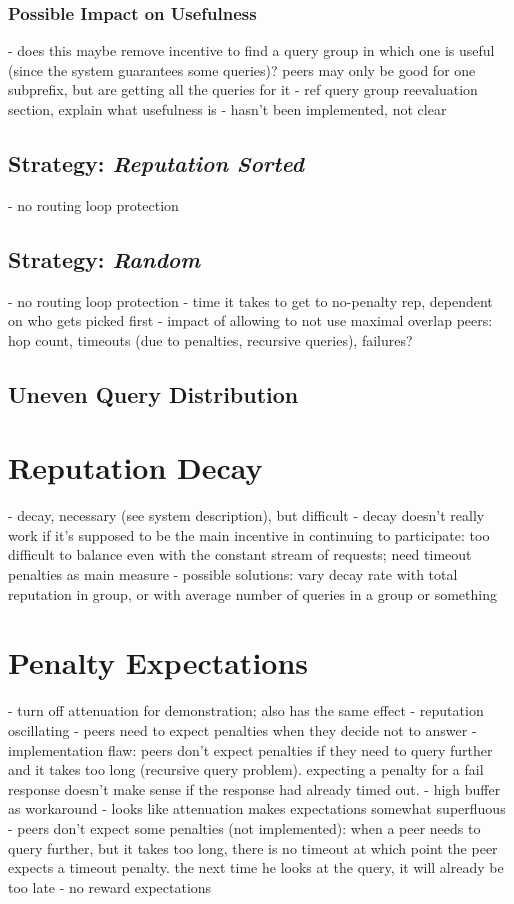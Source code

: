\subsubsection{Possible Impact on Usefulness}
- does this maybe remove incentive to find a query group in which one is useful
  (since the system guarantees some queries)? peers may only be good for one
  subprefix, but are getting all the queries for it
- ref query group reevaluation section, explain what usefulness is
- hasn't been implemented, not clear

\subsection{Strategy: \emph{Reputation Sorted}}
- no routing loop protection
\subsection{Strategy: \emph{Random}}
- no routing loop protection
- time it takes to get to no-penalty rep, dependent on who gets picked first
- impact of allowing to not use maximal overlap peers: hop count, timeouts (due
  to penalties, recursive queries), failures?
\subsection{Uneven Query Distribution}

\section{Reputation Decay}
- decay, necessary (see system description), but difficult
- decay doesn't really work if it's supposed to be the main incentive in
  continuing to participate: too difficult to balance even with the constant
  stream of requests; need timeout penalties as main measure
- possible solutions: vary decay rate with total reputation in group, or with
  average number of queries in a group or something

\section{Penalty Expectations}
\label{sec:penalty_expectations}
- turn off attenuation for demonstration; also has the same effect
- reputation oscillating
- peers need to expect penalties when they decide not to answer
- implementation flaw: peers don't expect penalties if they need to query
  further and it takes too long (recursive query problem). expecting a penalty
  for a fail response doesn't make sense if the response had already timed out.
- high buffer as workaround
- looks like attenuation makes expectations somewhat superfluous
- peers don't expect some penalties (not implemented): when a peer needs to
  query further, but it takes too long, there is no timeout at which point the
  peer expects a timeout penalty. the next time he looks at the query, it will
  already be too late
- no reward expectations

